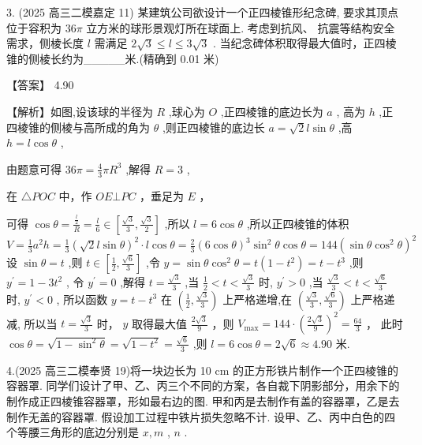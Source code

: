 \documentclass[10pt]{article}
\begin{document}
3. (2025 高三二模嘉定 11) 某建筑公司欲设计一个正四棱锥形纪念碑, 要求其顶点位于容积为 \({36\pi }\) 立方米的球形景观灯所在球面上. 考虑到抗风、 抗震等结构安全需求，侧棱长度 \(l\) 需满足 \(2\sqrt{3} \leq  l \leq  3\sqrt{3}\) . 当纪念碑体积取得最大值时，正四棱锥的侧棱长约为\_\_\_\_\_米.(精确到 0.01 米)

【答案】 4.90

【解析】如图,设该球的半径为 \(R\) ,球心为 \(O\) ,正四棱锥的底边长为 \(a\) , 高为 \(h\) ,正四棱锥的侧棱与高所成的角为 \(\theta\) ,则正四棱锥的底边长 \(a = \sqrt{2}l\sin \theta\) ,高 \(h = l\cos \theta\) ,

由题意可得 \({36\pi } = \frac{4}{3}\pi {R}^{3}\) ,解得 \(R = 3\) ,

在 \(\bigtriangleup  {POC}\) 中，作 \({OE}\bot {PC}\) ，垂足为 \(E\) ，

可得 \(\cos \theta  = \frac{\frac{l}{2}}{R} = \frac{l}{6} \in  \left\lbrack  {\frac{\sqrt{3}}{3},\frac{\sqrt{3}}{2}}\right\rbrack\) ,所以 \(l = 6\cos \theta\) ,所以正四棱锥的体积 \(V = \frac{1}{3}{a}^{2}h = \frac{1}{3}{\left( \sqrt{2}l\sin \theta \right) }^{2} \cdot  l\cos \theta  = \frac{2}{3}{\left( 6\cos \theta \right) }^{3}{\sin }^{2}\theta \cos \theta  = {144}{\left( \sin \theta {\cos }^{2}\theta \right) }^{2}\) 设 \(\sin \theta  = t\) ,则 \(t \in  \left\lbrack  {\frac{1}{2},\frac{\sqrt{6}}{3}}\right\rbrack\) ,令 \(y = \sin \theta {\cos }^{2}\theta  = t\left( {1 - {t}^{2}}\right)  = t - {t}^{3}\) ,则 \({y}^{\prime } = 1 - 3{t}^{2}\) , 令 \({y}^{\prime } = 0\) ,解得 \(t = \frac{\sqrt{3}}{3}\) ,当 \(\frac{1}{2} < t < \frac{\sqrt{3}}{3}\) 时, \({y}^{\prime } > 0\) ,当 \(\frac{\sqrt{3}}{3} < t < \frac{\sqrt{6}}{3}\) 时, \({y}^{\prime } < 0\) , 所以函数 \(y = t - {t}^{3}\) 在 \(\left( {\frac{1}{2},\frac{\sqrt{3}}{3}}\right)\) 上严格递增,在 \(\left( {\frac{\sqrt{3}}{3},\frac{\sqrt{6}}{3}}\right)\) 上严格递减, 所以当 \(t = \frac{\sqrt{3}}{3}\) 时， \(y\) 取得最大值 \(\frac{2\sqrt{3}}{9}\) ，则 \({V}_{\max } = {144} \cdot  {\left( \frac{2\sqrt{3}}{9}\right) }^{2} = \frac{64}{3}\) ， 此时 \(\cos \theta  = \sqrt{1 - {\sin }^{2}\theta } = \sqrt{1 - {t}^{2}} = \frac{\sqrt{6}}{3}\) ,则 \(l = 6\cos \theta  = 2\sqrt{6} \approx  {4.90}\) 米.

4.(2025 高三二模奉贤 19)将一块边长为 10 cm 的正方形铁片制作一个正四棱锥的容器罩. 同学们设计了甲、乙、丙三个不同的方案，各自裁下阴影部分，用余下的制作成正四棱锥容器罩，形如最右边的图. 甲和丙是去制作有盖的容器罩，乙是去制作无盖的容器罩. 假设加工过程中铁片损失忽略不计. 设甲、乙、丙中白色的四个等腰三角形的底边分别是 \(x,m\) , \(n\) .
\end{document}
